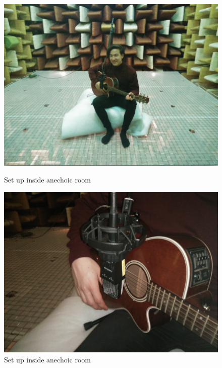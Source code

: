 \begin{figure}[H]
\centering
	\begin{minipage}{0.49\textwidth}
  	  
    		\includegraphics[scale=0.22]{figures/recording/setup1.png}
    		\caption{Set up inside anechoic room}
    		\label{fig:setup1}
    \end{minipage}
    \begin{minipage}{0.49\textwidth}
  	  
    		\includegraphics[scale=0.22]{figures/recording/setup2.png}
    		\caption{Set up inside anechoic room}
    		\label{fig:setup2}
    \end{minipage}
\end{figure} 

